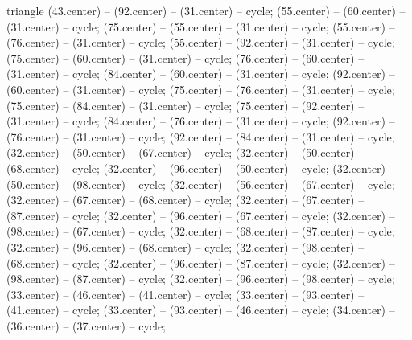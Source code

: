 {\begin{pgfonlayer}{triangle}
 (43.center) -- (92.center) -- (31.center) -- cycle; 
 (55.center) -- (60.center) -- (31.center) -- cycle; 
 (75.center) -- (55.center) -- (31.center) -- cycle; 
 (55.center) -- (76.center) -- (31.center) -- cycle; 
 (55.center) -- (92.center) -- (31.center) -- cycle; 
 (75.center) -- (60.center) -- (31.center) -- cycle; 
 (76.center) -- (60.center) -- (31.center) -- cycle; 
 (84.center) -- (60.center) -- (31.center) -- cycle; 
 (92.center) -- (60.center) -- (31.center) -- cycle; 
 (75.center) -- (76.center) -- (31.center) -- cycle; 
 (75.center) -- (84.center) -- (31.center) -- cycle; 
 (75.center) -- (92.center) -- (31.center) -- cycle; 
 (84.center) -- (76.center) -- (31.center) -- cycle; 
 (92.center) -- (76.center) -- (31.center) -- cycle; 
 (92.center) -- (84.center) -- (31.center) -- cycle; 
 (32.center) -- (50.center) -- (67.center) -- cycle; 
 (32.center) -- (50.center) -- (68.center) -- cycle; 
 (32.center) -- (96.center) -- (50.center) -- cycle; 
 (32.center) -- (50.center) -- (98.center) -- cycle; 
 (32.center) -- (56.center) -- (67.center) -- cycle; 
 (32.center) -- (67.center) -- (68.center) -- cycle; 
 (32.center) -- (67.center) -- (87.center) -- cycle; 
 (32.center) -- (96.center) -- (67.center) -- cycle; 
 (32.center) -- (98.center) -- (67.center) -- cycle; 
 (32.center) -- (68.center) -- (87.center) -- cycle; 
 (32.center) -- (96.center) -- (68.center) -- cycle; 
 (32.center) -- (98.center) -- (68.center) -- cycle; 
 (32.center) -- (96.center) -- (87.center) -- cycle; 
 (32.center) -- (98.center) -- (87.center) -- cycle; 
 (32.center) -- (96.center) -- (98.center) -- cycle; 
 (33.center) -- (46.center) -- (41.center) -- cycle; 
 (33.center) -- (93.center) -- (41.center) -- cycle; 
 (33.center) -- (93.center) -- (46.center) -- cycle; 
 (34.center) -- (36.center) -- (37.center) -- cycle; 

\end{pgfonlayer}}
